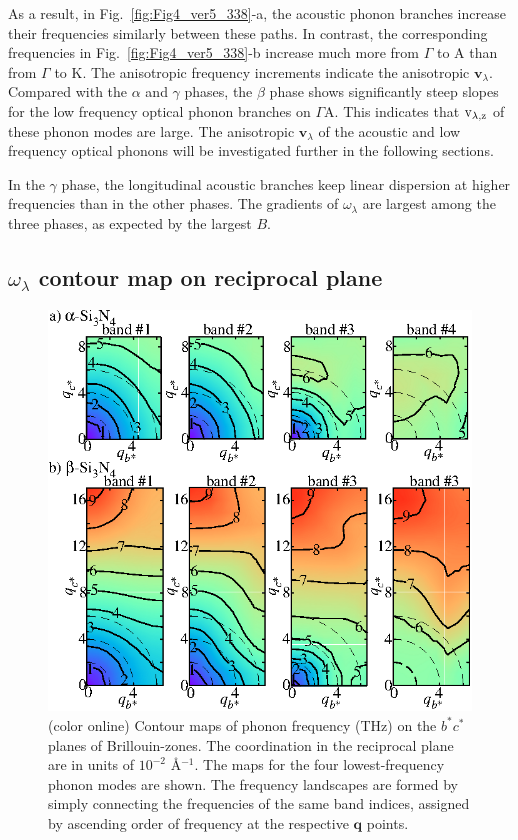 \documentclass[twocolumn,amsmath,amssymb,a4paper,prb,superscriptaddress,floatfix]{revtex4-1}
\begin{document}
As a result, in Fig.~\ref{fig:Fig4_ver5_338}-a, the acoustic phonon branches
increase their frequencies similarly between these paths. In contrast, the
corresponding frequencies in Fig.~\ref{fig:Fig4_ver5_338}-b increase much more
from $\Gamma$ to A than from $\Gamma$ to K.  The anisotropic frequency
increments indicate the anisotropic $\mathbf{v}_\lambda$. Compared with the
$\alpha$ and $\gamma$ phases, the $\beta$ phase shows significantly steep slopes
for the low frequency optical phonon branches on $\Gamma$A. This indicates that
 $\rm{v}_{\lambda,z}$ of these phonon modes are large. The anisotropic
$\mathbf{v}_\lambda$ of the acoustic and low frequency optical phonons will be
investigated further in the following sections. 

In the $\gamma$ phase, the longitudinal acoustic branches keep linear dispersion at
higher frequencies than in the other phases.  The gradients of $\omega_\lambda$
are largest among the three phases, as expected by the largest $B$.

\subsection{$\omega_\lambda$ contour map on reciprocal plane}

\begin{figure}[ht]
 \centerins
  \includegraphics[width=\linewidth]{Fig2_small.eps} \caption{(color
  online) Contour maps of phonon frequency (THz) on the $b^*c^*$
  planes of Brillouin-zones. The coordination in the reciprocal plane 
   are in units of $10^{-2}$ \AA$^{-1}$. The maps for the four lowest-frequency
  phonon modes are shown. The frequency landscapes are formed by simply
  connecting the frequencies of the same band indices, assigned by
  ascending order of frequency at the respective $\mathbf {q}$
  points. \label{fig:Fig3_338} }
 \centering
\end{figure}
\end{document}
